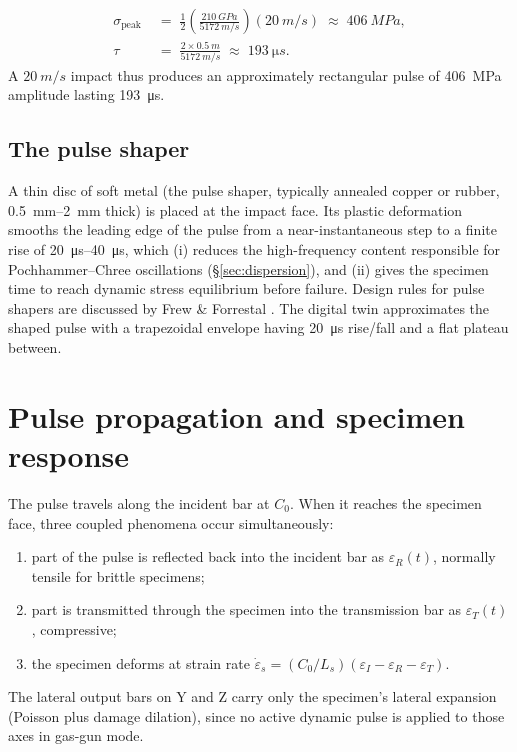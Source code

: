\documentclass[11pt,a4paper,openany]{book}
\providecommand{\SI}[2]{\qty{#1}{#2}}
\providecommand{\SIrange}[3]{\qtyrange{#1}{#2}{#3}}
\theoremstyle{handbook}
\newcommand{\sig}{\sigma}
\newcommand{\eps}{\varepsilon}
\newcommand{\epsdot}{\dot\eps}
\newcommand{\Cz}{C_0}
\newcommand{\Ls}{L_s}
\newcommand{\sigpeak}{\sig_{\text{peak}}}
\begin{document}
\begin{stepbox}[Worked example: striker velocity $V=\SI{20}{m/s}$]
\begin{align*}
  \sigpeak &\;=\; \tfrac{1}{2}\!\left(\frac{\SI{210}{GPa}}{\SI{5172}{m/s}}\right)\!(\SI{20}{m/s})
              \;\approx\; \SI{406}{MPa}, \\
  \tau     &\;=\; \frac{2\times\SI{0.5}{m}}{\SI{5172}{m/s}}
              \;\approx\; \SI{193}{\micro s}.
\end{align*}
A $\SI{20}{m/s}$ impact thus produces an approximately rectangular pulse of
\SI{406}{MPa} amplitude lasting \SI{193}{\micro s}.
\end{stepbox}

\subsection{The pulse shaper}\label{sec:pulse-shaper}

A thin disc of soft metal (the pulse shaper, typically annealed copper or
rubber, \SIrange{0.5}{2}{mm} thick) is placed at the impact face. Its plastic
deformation smooths the leading edge of the pulse from a near-instantaneous
step to a finite rise of \SIrange{20}{40}{\micro s}, which (i) reduces the
high-frequency content responsible for Pochhammer--Chree oscillations
(\S\ref{sec:dispersion}), and (ii) gives the specimen time to reach dynamic
stress equilibrium before failure. Design rules for pulse shapers are
discussed by Frew \& Forrestal \cite{FrewForrestal2002}. The digital twin
approximates the shaped pulse with a trapezoidal envelope having
\SI{20}{\micro s} rise/fall and a flat plateau between.

\section{Pulse propagation and specimen response}

The pulse travels along the incident bar at $\Cz$. When it reaches the
specimen face, three coupled phenomena occur simultaneously:
\begin{enumerate}[leftmargin=*,itemsep=2pt]
  \item part of the pulse is reflected back into the incident bar as
        $\eps_R(t)$, normally tensile for brittle specimens;
  \item part is transmitted through the specimen into the transmission
        bar as $\eps_T(t)$, compressive;
  \item the specimen deforms at strain rate
        $\epsdot_s = (\Cz/\Ls)(\eps_I - \eps_R - \eps_T)$.
\end{enumerate}
The lateral output bars on Y and Z carry only the specimen's lateral
expansion (Poisson plus damage dilation), since no active dynamic pulse is
applied to those axes in gas-gun mode.
\end{document}
